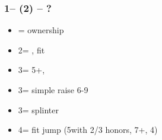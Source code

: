 \documentclass[12pt, a4paper]{article}
\begin{document}
\subsubsection*{1\hearts -- (2\hearts) -- ?}
\begin{itemize}
    \item \dbl = ownership
    \item 2\spades = \invp, fit
    \item 3\minor = 5+, \gf
    \item 3\hearts = simple raise 6-9
    \item 3\spades = splinter
    \item 4\minor = fit jump (5\minor with 2/3 honors, 7+, 4\hearts)
\end{itemize}

\end{document}
